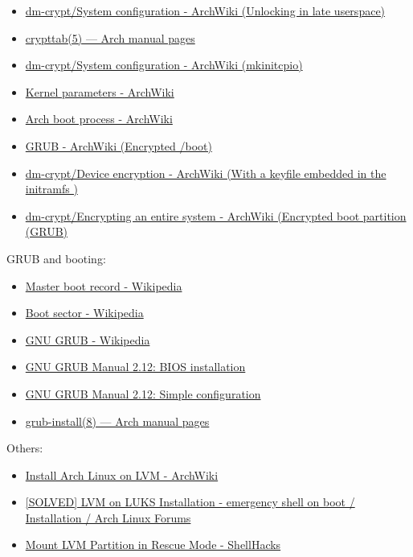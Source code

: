 \documentclass[12pt, a4paper]{article}
\begin{document}
  \begin{itemize}
    \item \href{https://wiki.archlinux.org/title/dm-crypt/System_configuration#Unlocking_in_late_userspace}{dm-crypt/System configuration - ArchWiki (Unlocking in late userspace)}
    \item \href{https://man.archlinux.org/man/crypttab.5.en}{crypttab(5) — Arch manual pages}
    \item \href{https://wiki.archlinux.org/title/dm-crypt/System_configuration#mkinitcpio}{dm-crypt/System configuration - ArchWiki (mkinitcpio)}
    \item \href{https://wiki.archlinux.org/title/Kernel_parameters}{Kernel parameters - ArchWiki}
    \item \href{https://wiki.archlinux.org/title/Arch_boot_process}{Arch boot process - ArchWiki}
    \item \href{https://wiki.archlinux.org/title/GRUB#Encrypted_/boot}{GRUB - ArchWiki (Encrypted /boot)}
    \item \href{https://wiki.archlinux.org/title/Dm-crypt/Device_encryption#With_a_keyfile_embedded_in_the_initramfs}{dm-crypt/Device encryption - ArchWiki (With a keyfile embedded in the initramfs
    )}
    \item \href{https://wiki.archlinux.org/title/Dm-crypt/Encrypting_an_entire_system#Encrypted_boot_partition_(GRUB)}{dm-crypt/Encrypting an entire system - ArchWiki (Encrypted boot partition (GRUB)}
  \end{itemize}
  GRUB and booting:
  \begin{itemize}
    \item \href{https://en.wikipedia.org/wiki/Master_boot_record}{Master boot record - Wikipedia}
    \item \href{https://en.wikipedia.org/wiki/Boot_sector}{Boot sector - Wikipedia}
    \item \href{https://en.wikipedia.org/wiki/GNU_GRUB}{GNU GRUB - Wikipedia}
    \item \href{https://www.gnu.org/software/grub/manual/grub/html_node/BIOS-installation.html#BIOS-installation}{GNU GRUB Manual 2.12: BIOS installation}
    \item \href{https://www.gnu.org/software/grub/manual/grub/html_node/Simple-configuration.html#Simple-configuration}{GNU GRUB Manual 2.12: Simple configuration}
    \item \href{https://man.archlinux.org/man/grub-install.8.en}{grub-install(8) — Arch manual pages}
  \end{itemize}
  Others:
  \begin{itemize}
    \item \href{https://wiki.archlinux.org/title/Install_Arch_Linux_on_LVM}{Install Arch Linux on LVM - ArchWiki}
    \item \href{https://bbs.archlinux.org/viewtopic.php?id=243391}{[SOLVED] LVM on LUKS Installation - emergency shell on boot / Installation / Arch Linux Forums}
    \item \href{https://www.shellhacks.com/mount-lvm-partition-in-rescue-mode/}{Mount LVM Partition in Rescue Mode - ShellHacks}
  \end{itemize}
\end{document}
